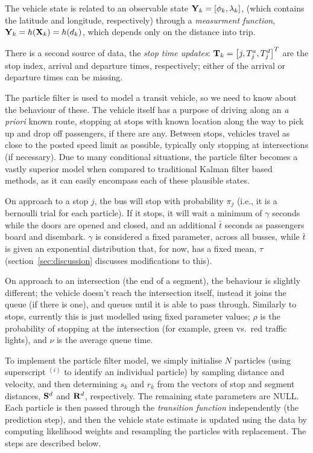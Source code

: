 \documentclass[draftcls,a4paper,onecolumn]{IEEEtran}\usepackage[]{graphicx}\usepackage[]{color}
\begin{document}
The vehicle state is related to an observable state $\mathbf{Y}_k = [\phi_k, \lambda_k]$,
(which contains the latitude and longitude, respectively)
through a \emph{measurment function}, $\mathbf{Y}_k = h(\mathbf{X}_k) = h(d_k)$,
which depends only on the distance into trip.

There is a second source of data, the \emph{stop time updates}:
\mbox{$\mathbf{T}_k = \left[ j, T^a_j , T^d_j \right]^T$}
are the stop index, arrival and departure times,
respectively; 
either of the arrival or departure times can be missing.


The particle filter is used to model a transit vehicle,
so we need to know about the behaviour of these.
The vehicle itself has a purpose of driving along an \emph{a priori} known route,
stopping at stops with known location along the way to pick up
and drop off passengers, if there are any.
Between stops, vehicles travel as close to the posted speed limit as possible,
typically only stopping at intersections (if necessary).
Due to many conditional situations, 
the particle filter becomes a vastly superior model when compared to traditional
Kalman filter based methods, as it can easily encompass each of these plausible states.

On approach to a stop $j$, the bus will stop with probability $\pi_j$ 
(i.e., it is a bernoulli trial for each particle).
If it stops, it will wait a minimum of $\gamma$ seconds while the doors are opened and closed,
and an additional $\bar t$ seconds as passengers board and disembark.
$\gamma$ is considered a fixed parameter, across all busses, 
while $\bar t$ is given an exponential distribution that, for now, has a fixed mean, $\tau$
(section~\ref{sec:discussion} discusses modifications to this).

On approach to an intersection (the end of a segment),
the behaviour is slightly different;
the vehicle doesn't reach the intersection itself, instead it joins the queue
(if there is one), and queues until it is able to pass through.
Similarly to stops, currently this is just modelled using fixed parameter values;
$\rho$ is the probability of stopping at the intersection
(for example, green vs.\ red traffic lights),
and $\nu$ is the average queue time.


To implement the particle filter model, 
we simply initialise $N$ particles (using superscript $^{(i)}$ to identify an individual particle)
by sampling distance and velocity, and then determining $s_k$ and $r_k$ from the 
vectors of stop and segment distances, $\mathbf{S}^d$ and $\mathbf{R}^d$, respectively.
The remaining state parameters are NULL.
Each particle is then passed through the \emph{transition function} independently (the prediction step),
and then the vehicle state estimate is updated using the data by computing likelihood weights
and resampling the particles with replacement.
The steps are described below.
\end{document}
